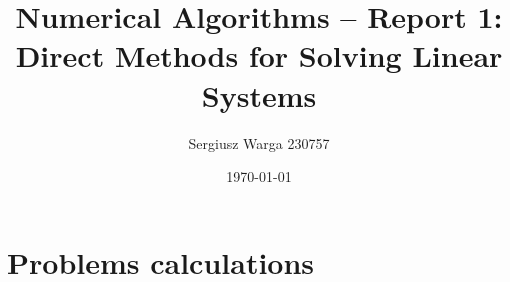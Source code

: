 \documentclass[a4paper]{article}
\title{Numerical Algorithms – Report 1: Direct Methods for Solving Linear Systems}
\author{Sergiusz Warga 230757}
\date{\today}
\begin{document}
\maketitle
\tableofcontents
\pagebreak


\section{Problems calculations}

% 
\end{document}
